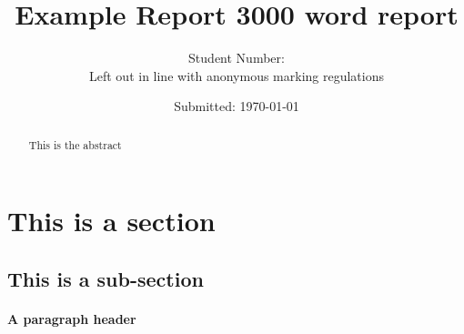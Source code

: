 \documentclass[a4paper,11pt]{article}
\begin{document}
%
   \title{Example Report \vfill
   \vfill 3000 word report}
   \author{Student Number:  \\ Left out in line with anonymous marking regulations}
   \date{Submitted: \today}

   \maketitle
   \newpage
   \tableofcontents
 
  \newpage


\begin{abstract}
 This is the abstract
\end{abstract}
\section{This is a section}
\blindtext
\subsection{This is a sub-section}
\paragraph{A paragraph header}

\newpage
\listoftables

\newpage
\listoffigures

\newpage


\end{document}

